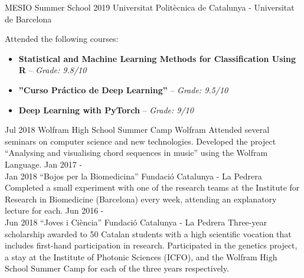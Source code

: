 \documentclass[]{resume}
\begin{document}
\begin{adjustwidth}{10pt}{10pt}
\renewcommand{\twentylen}{\itemwidth}
\begin{twenty}[\chronowidth]
    {MESIO Summer School 2019}
    {Universitat Politècnica de Catalunya - Universitat de Barcelona}
    {Attended the following courses:
     \begin{itemize}
         \item \textbf{Statistical and Machine Learning Methods for Classification Using R} -- \textit{Grade: 9.8/10}
         \item \textbf{''Curso Práctico de Deep Learning''} --  \textit{Grade: 9.5/10}
         \item \textbf{Deep Learning with PyTorch} --  \textit{Grade: 9/10}
     \end{itemize}
    }
    \twentyitem
    {Jul 2018}
    {Wolfram High School Summer Camp}
    {Wolfram}
    {Attended several seminars on computer science and new technologies. Developed the project ``Analysing and visualising chord sequences in music'' using the Wolfram Language.} %
    \twentyitem
    {Jan 2017 - \\ Jan 2018}
    {``Bojos per la Biomedicina''}
    {Fundació Catalunya - La Pedrera}
    {Completed a small experiment with one of the research teams at the Institute for Research in Biomedicine (Barcelona) every week, attending an explanatory lecture for each.}
    \twentyitem
    {Jun 2016 - \\ Jun 2018}
    {``Joves i Ciència''}
    {Fundació Catalunya - La Pedrera}
    {Three-year scholarship awarded to 50 Catalan students with a high scientific vocation that includes first-hand participation in research. Participated in the genetics project, a stay at the Institute of Photonic Sciences (ICFO), and the Wolfram High School Summer Camp for each of the three years respectively.}
\end{twenty}


\end{adjustwidth}

\end{document}
